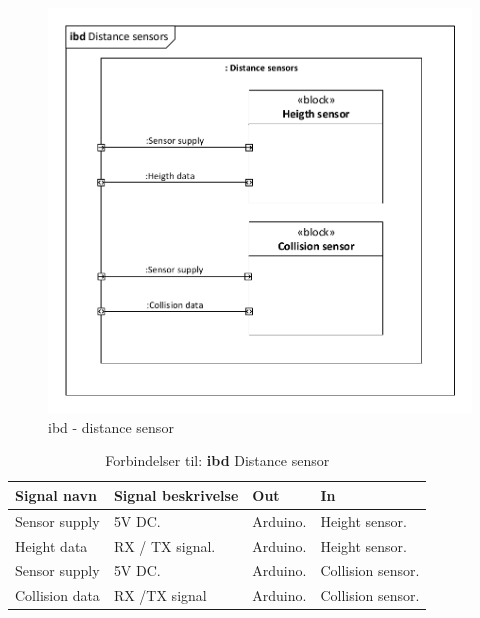 

\begin{figure}[H]
\centering
\includegraphics[width=1\textwidth]{Billeder/IBD/ibd4_distancesensor.pdf}
\caption{ibd - distance sensor}
\label{fig:ibd_distancesensor}
\end{figure}

\begin{table}[H]
	\centering
		\begin{tabular}{|p{2.5 cm}|p{5.5 cm}|p{2.5 cm}|p{2.5 cm}|} 
		\hline
			\textbf{Signal navn} 	& \textbf{Signal beskrivelse}		& \textbf{Out} 				& \textbf{In}     \\ \hline
			Sensor supply & 5V DC.  & Arduino. & Height sensor.  \\ \hline
			Height data & RX / TX signal. & Arduino.	& Height sensor.	\\ \hline
			Sensor supply & 5V DC. & Arduino. & Collision sensor.	\\ \hline
			Collision data & RX /TX signal & Arduino. & Collision sensor.			    \\ \hline  
		\end{tabular}
	\caption{Forbindelser til: \textbf{ibd} Distance sensor}
	\label{tab:IBDDistancesensor}
\end{table}
